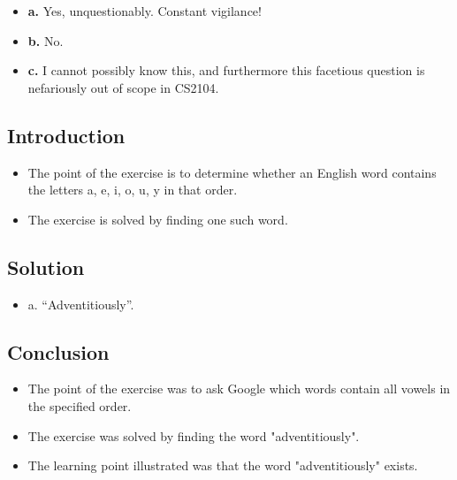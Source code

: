 \documentclass[12pt]{article}
\begin{document}
\begin{itemize}
\item \textbf{a.} Yes, unquestionably. Constant vigilance!
\item \textbf{b.} No.
\item \textbf{c.} I cannot possibly know this, and furthermore this facetious
  question is nefariously out of scope in CS2104.
\end{itemize}


\subsection{Introduction}

\begin{itemize}

\item
  The point of the exercise is to determine whether an English word contains the letters a, e, i, o, u, y in that order.

\item
  The exercise is solved by finding one such word.

\end{itemize}


\subsection{Solution}

\begin{itemize}
\item a. ``Adventitiously''.
\end{itemize}


\subsection{Conclusion}

\begin{itemize}

\item
  The point of the exercise was to ask Google which words contain all vowels in the specified order.

\item
  The exercise was solved by finding the word "adventitiously".

\item
  The learning point illustrated was that the word "adventitiously" exists.

\end{itemize}
\end{document}
